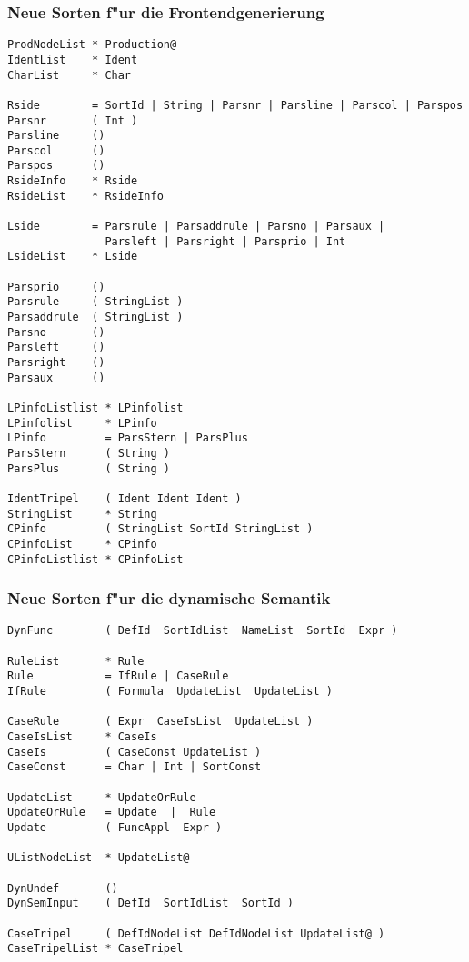 \subsubsection{Neue Sorten f"ur die Frontendgenerierung}
\begin{verbatim}
ProdNodeList * Production@
IdentList    * Ident
CharList     * Char

Rside        = SortId | String | Parsnr | Parsline | Parscol | Parspos
Parsnr       ( Int )
Parsline     ()
Parscol      ()
Parspos      ()
RsideInfo    * Rside
RsideList    * RsideInfo

Lside        = Parsrule | Parsaddrule | Parsno | Parsaux |
               Parsleft | Parsright | Parsprio | Int
LsideList    * Lside

Parsprio     ()
Parsrule     ( StringList )
Parsaddrule  ( StringList )
Parsno       ()
Parsleft     ()
Parsright    ()
Parsaux      ()

LPinfoListlist * LPinfolist
LPinfolist     * LPinfo
LPinfo         = ParsStern | ParsPlus
ParsStern      ( String )
ParsPlus       ( String )

IdentTripel    ( Ident Ident Ident )
StringList     * String
CPinfo         ( StringList SortId StringList )
CPinfoList     * CPinfo
CPinfoListlist * CPinfoList
\end{verbatim}

\subsubsection{Neue Sorten f"ur die dynamische Semantik}

\begin{verbatim}
DynFunc        ( DefId  SortIdList  NameList  SortId  Expr )

RuleList       * Rule
Rule           = IfRule | CaseRule
IfRule         ( Formula  UpdateList  UpdateList )

CaseRule       ( Expr  CaseIsList  UpdateList )
CaseIsList     * CaseIs
CaseIs         ( CaseConst UpdateList )
CaseConst      = Char | Int | SortConst

UpdateList     * UpdateOrRule
UpdateOrRule   = Update  |  Rule
Update         ( FuncAppl  Expr )

UListNodeList  * UpdateList@

DynUndef       ()
DynSemInput    ( DefId  SortIdList  SortId )

CaseTripel     ( DefIdNodeList DefIdNodeList UpdateList@ )
CaseTripelList * CaseTripel
\end{verbatim}


